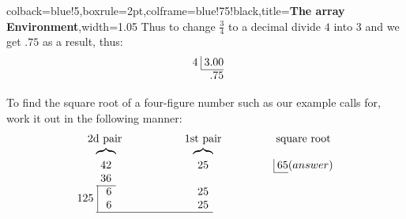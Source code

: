 \begin{tcblisting}{colback=blue!5,boxrule=2pt,colframe=blue!75!black,title=\textbf{The array Environment},width=1.05\textwidth}
Thus to change $\frac34$ to a decimal divide $4$ into $3$
and we get $.75$ as a result, thus:
\[
\begin{array}{r@{}r@{}}
4 \; & \vline \; 3.00 \\\cline{2-2}
     &            .75
\end{array}
\]

To find the square root of a four-figure number
such as our example calls for, work it out in the
following manner:
\[
\arraycolsep=0em
\begin{array}{cccccccccccc}
\multicolumn{3}{c}{\text{2d pair}} &\qquad&\qquad&
\multicolumn{3}{c}{\text{1st pair}}&\qquad&\qquad&
\multicolumn{2}{c}{\text{square root}}\\
 & \overbrace{\quad}&\ZZZ&&&\ZZZ&\overbrace{\quad}&\ZZZ\\
 & 42 &&&&& 25 &&&&\vline\;65&(answer)\\\cline{11-11}
 & 36 &&&&& \\\cline{2-2}
\multirow{2}{*}{125\:} & \vline\hfill \Z6 \hfill&&&&& 25\\
 & \vline\hfill \Z6 \hfill&&&&& 25\\\cline{2-7}
\end{array}
\]

\end{tcblisting}

